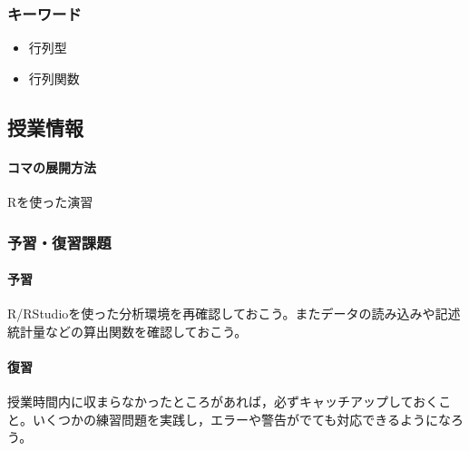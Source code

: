 \subsubsection{キーワード}
\begin{itemize}
	\item 行列型
	\item 行列関数
\end{itemize}
\subsection{授業情報}
\paragraph{コマの展開方法}
Rを使った演習
\subsubsection{予習・復習課題}
\paragraph{予習}R/RStudioを使った分析環境を再確認しておこう。またデータの読み込みや記述統計量などの算出関数を確認しておこう。
\paragraph{復習}授業時間内に収まらなかったところがあれば，必ずキャッチアップしておくこと。いくつかの練習問題を実践し，エラーや警告がでても対応できるようになろう。